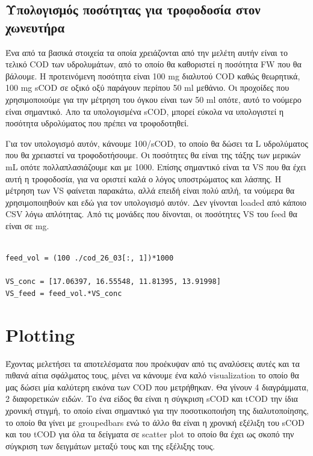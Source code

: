 \documentclass[11pt]{article}
\begin{document}
\subsection{Υπολογισμός ποσότητας για τροφοδοσία στον χωνευτήρα}
\label{sec:org73708f7}
Ένα από τα βασικά στοιχεία τα οποία χρειάζονται από την μελέτη αυτήν είναι το τελικό COD των υδρολυμάτων, από το οποίο θα καθοριστεί η ποσότητα FW που θα βάλουμε. Η προτεινόμενη ποσότητα είναι 100 mg διαλυτού COD καθώς θεωρητικά, 100 mg sCOD σε οξικό οξύ παράγουν περίπου 50 ml μεθάνιο. Οι προχοίδες που χρησιμοποιούμε για την μέτρηση του όγκου είναι των 50 ml οπότε, αυτό το νούμερο είναι σημαντικό. Απο τα υπολογισμένα sCOD, μπορεί εύκολα να υπολογιστεί η ποσότητα υδρολύματος που πρέπει να τροφοδοτηθεί.

Για τον υπολογισμό αυτόν, κάνουμε 100/sCOD, το οποίο θα δώσει τα L υδρολύματος που θα χρειαστεί να τροφοδοτήσουμε. Οι ποσότητες θα είναι της τάξης των μερικών mL οπότε πολλαπλασιάζουμε και με 1000. Επίσης σημαντικό είναι τα VS που θα έχει αυτή η τροφοδοσία, για να οριστεί καλά ο λόγος υποστρώματος και λάσπης. Η μέτρηση των VS φαίνεται παρακάτω, αλλά επειδή είναι πολύ απλή, τα νούμερα θα χρησιμοποιηθούν και εδώ για τον υπολογισμό αυτόν. Δεν γίνονται loaded από κάποιο CSV λόγω απλότητας. Από τις μονάδες που δίνονται, οι ποσότητες VS του feed θα είναι σε mg.

\begin{verbatim}

feed_vol = (100 ./cod_26_03[:, 1])*1000

VS_conc = [17.06397, 16.55548, 11.81395, 13.91998]
VS_feed = feed_vol.*VS_conc
\end{verbatim}

\section{Plotting}
\label{sec:orgce7a9c8}
Έχοντας μελετήσει τα αποτελέσματα που προέκυψαν από τις αναλύσεις αυτές και τα πιθανά αίτια σφάλματος τους, μένει να κάνουμε ένα καλό visualization το οποίο θα μας δώσει μία καλύτερη εικόνα των COD που μετρήθηκαν. Θα γίνουν 4 διαγράμματα, 2 διαφορετικών ειδών. Το ένα είδος θα είναι η σύγκριση sCOD και tCOD την ίδια χρονική στιγμή, το οποίο είναι σημαντικό για την ποσοτικοποιήση της διαλυτοποίησης, το οποίο θα γίνει με groupedbars ενώ το άλλο θα είναι η χρονική εξέλιξη του sCOD και του tCOD για όλα τα δείγματα σε scatter plot το οποίο θα έχει ως σκοπό την σύγκριση των δειγμάτων μεταξύ τους και της εξέλιξης τους.
\end{document}
